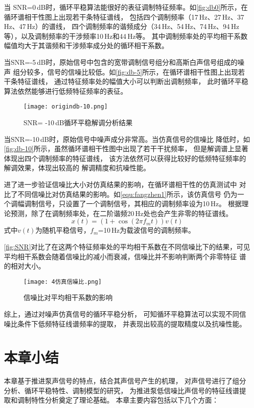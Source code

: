 当 SNR=0\,dB时，循环平稳算法能很好的表征调制特征频率。如\autoref{fig:db0}所示，在循环谱相干性图上出现若干条特征谱线，
包括四个调制频率（17\,Hz、27\,Hz、37\,Hz、47\,Hz）的谱线，
四个调制频率的谐频成分（34\,Hz、54\,Hz、74\,Hz、94\,Hz等），以及调制频率的干涉频率10\,Hz和44\,Hz等。
其中调制频率处的平均相干系数幅值均大于其谐频和干涉频率成分处的循环相干系数。

当SNR=-5\,dB时，原始信号中包含的宽带调制信号组分和高斯白声信号组成的噪声
组分较多，信号的信噪比较低。如\autoref{fig:db-5}所示，在循环谱相干性图上出现若干条特征谱线，
通过特征频率处的幅值大小可以判断出调制频率，
此时循环平稳算法依然能够进行低频特征频率的表征。

\begin{figure}[htbp]
    \centering
    \texttt{[image: origindb-10.png]}
    \caption{\label{fig:db-10}SNR= -10\,dB循环平稳解调分析结果}
\end{figure}

当SNR=-10\,dB时，原始信号中噪声成分非常高。当仿真信号的信噪比
降低时，如\autoref{fig:db-10}所示，虽然循环谱相干性图中出现了若干干扰频率，
但是解调谱上显著体现出四个调制频率的特征谱线，
该方法依然可以获得比较好的低频特征频率的解调效果，体现出较高的
解调精度和抗噪性能。

进了进一步验证信噪比大小对仿真结果的影响，在循环谱相干性的仿真测试中
对比了不同信噪比对仿真结果的影响。如\autoref{equ:fangzhen1}所示，该仿真信号
仍为一个调幅调制信号，只设置了一个调制信号，其相应的调制频率设为10\,Hz。
根据理论预测，除了在调制频率处，在二阶谐频20\,Hz处也会产生非零的特征谱线。
\begin{equation}
    \label{equ:fangzhen1}
    x\left ( t \right ) =\left ( 1+\cos \left ( 2\pi f_mt \right )  \right ) v\left ( t \right ) 
\end{equation}
式中$v\left ( t \right )$为随机平稳信号，$f_m$=10\,Hz为载波信号的调制频率。

\autoref{fig:SNR}对比了在这两个特征频率处的平均相干系数在不同信噪比下的结果，可见
平均相干系数会随着信噪比的减小而衰减，信噪比并不影响判断两个非零特征
谱的相对大小。

\begin{figure}[htbp]
    \centering
    \texttt{[image: 4仿真信噪比.png]}
    \caption{\label{fig:SNR}信噪比对平均相干系数的影响
    }
\end{figure}

综上，通过对噪声仿真信号的循环平稳分析，
可知循环平稳算法可以实现不同信噪比条件下低频特征线谱频率的提取，
并表现出较高的提取精度以及抗噪性能。
\section{本章小结}
本章基于推进泵声信号的特点，结合其声信号产生的机理，
对声信号进行了组分分析、循环平稳特性、调制模型的研究，
为推进泵低信噪比声信号的特征线谱提取和调制特性分析奠定了理论基础。
本章主要内容包括以下几个方面：

